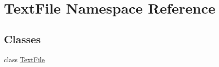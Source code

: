 \hypertarget{namespaceTextFile}{\section{Text\-File Namespace Reference}
\label{namespaceTextFile}
}
\subsection*{Classes}
\begin{DoxyCompactItemize}
\item 
class \hyperlink{classTextFile_1_1TextFile}{Text\-File}
\end{DoxyCompactItemize}

